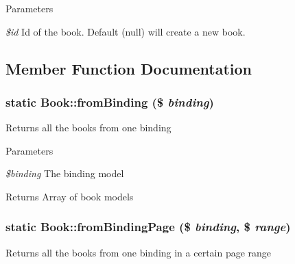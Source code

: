 \begin{DoxyParams}{Parameters}
\item[{\em \$id}]Id of the book. Default (null) will create a new book. \end{DoxyParams}


\subsection{Member Function Documentation}
\hypertarget{classBook_af0d410f2c2da5f56b57c8f3e59d799a6}{
\subsubsection[{fromBinding}]{\setlength{\rightskip}{0pt plus 5cm}static Book::fromBinding (\$ {\em binding})}}
\label{classBook_af0d410f2c2da5f56b57c8f3e59d799a6}
Returns all the books from one binding


\begin{DoxyParams}{Parameters}
\item[{\em \$binding}]The binding model \end{DoxyParams}
\begin{DoxyReturn}{Returns}
Array of book models 
\end{DoxyReturn}
\hypertarget{classBook_a4ec502681f3507edb7c64bb012463d33}{
\subsubsection[{fromBindingPage}]{\setlength{\rightskip}{0pt plus 5cm}static Book::fromBindingPage (\$ {\em binding}, \/  \$ {\em range})}}
\label{classBook_a4ec502681f3507edb7c64bb012463d33}
Returns all the books from one binding in a certain page range


